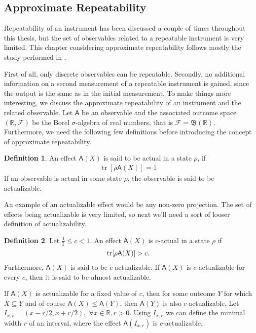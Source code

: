 \documentclass[a4paper,12pt]{wihuri}
\theoremstyle{definition}
\newtheorem{definition}{Definition}
\numberwithin{definition}{section}
\numberwithin{example}{section}
\numberwithin{theorem}{section}
\numberwithin{proposition}{section}
\numberwithin{lemma}{section}
\newcommand{\salg}{\mathcal{F}}%
\newcommand{\borel}{\mathfrak{B}}
\newcommand{\A}{\mathsf{A}}%
\DeclareMathOperator{\tr}{tr}
\begin{document}

\subsection{Approximate Repeatability}
Repeatability of an instrument has been discussed a couple of times throughout this thesis, but the set of observables related to a repeatable instrument is very limited. This chapter considering approximate repeatability follows mostly the study performed in \cite{intristic_unsharpness}. 

First of all, only discrete observables can be repeatable. Secondly, no additional information on a second measurement of a repeatable instrument is gained, since the output is the same as in the initial measurement. To make things more interesting, we discuss the approximate repeatability of an instrument and the related observable. Let $\A$ be an observable and the associated outcome space $(\mathbb{R}, \salg)$ be the Borel $\sigma$-algebra of real numbers, that is $\salg = \borel(\mathbb{R})$. Furthermore, we need the following few definitions before introducing the concept of approximate repeatability.


\begin{definition}
An effect $\A(X)$ is said to be actual in a state $\rho$, if
\begin{align*}
\tr[\rho\A(X)] = 1
\end{align*}
If an observable is actual in some state $\rho$, the observable is said to be actualizable.
\end{definition}
An example of an actualizable effect would be any non-zero projection. The set of effects being actualizable is very limited, so next we'll need a sort of looser definition of actualizability.


\begin{definition}
Let $\frac{1}{2} \leq c < 1$. An effect $\A(X)$ is $c$-actual in a state $\rho$ if
\begin{align*}
\tr[\rho\A(X)] > c\text.
\end{align*}
Furthermore, $\A(X)$ is said to be $c$-actualizable. If $\A(X)$ is $c$-actualizable for every $c$, then it is said to be almost actualizable.
\end{definition} 
If $\A(X)$ is actualizable for a fixed value of $c$, then for some outcome $Y$ for which $X \subseteq Y$ and of course $\A(X) \leq \A(Y)$, then $\A(Y)$ is also $c$-actualizable. Let $I_{x,r}=(x-r/2, x+r/2),\,\, \forall x \in \mathbb{R}, r > 0$. Using $I_{x,r}$ we can define the minimal width $r$ of an interval, where the effect $\A(I_{x,r})$ is $c$-actualizable.
 
\end{document}
